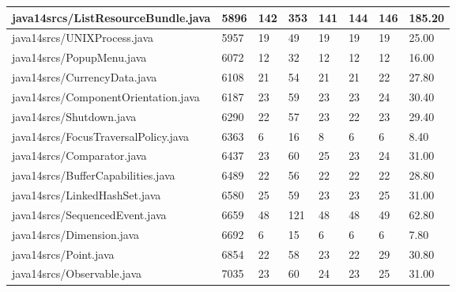 \begin{tabular}{|l|l|l|l|l|l|l|l|}
\hline
java14srcs/ListResourceBundle.java                 & 5896        & 142       & 353       & 141       & 144       & 146       & 185.20    \\
\hline
java14srcs/UNIXProcess.java                        & 5957        & 19        & 49        & 19        & 19        & 19        & 25.00     \\
\hline
java14srcs/PopupMenu.java                          & 6072        & 12        & 32        & 12        & 12        & 12        & 16.00     \\
\hline
java14srcs/CurrencyData.java                       & 6108        & 21        & 54        & 21        & 21        & 22        & 27.80     \\
\hline
java14srcs/ComponentOrientation.java               & 6187        & 23        & 59        & 23        & 23        & 24        & 30.40     \\
\hline
java14srcs/Shutdown.java                           & 6290        & 22        & 57        & 23        & 22        & 23        & 29.40     \\
\hline
java14srcs/FocusTraversalPolicy.java               & 6363        & 6         & 16        & 8         & 6         & 6         & 8.40      \\
\hline
java14srcs/Comparator.java                         & 6437        & 23        & 60        & 25        & 23        & 24        & 31.00     \\
\hline
java14srcs/BufferCapabilities.java                 & 6489        & 22        & 56        & 22        & 22        & 22        & 28.80     \\
\hline
java14srcs/LinkedHashSet.java                      & 6580        & 25        & 59        & 23        & 23        & 25        & 31.00     \\
\hline
java14srcs/SequencedEvent.java                     & 6659        & 48        & 121       & 48        & 48        & 49        & 62.80     \\
\hline
java14srcs/Dimension.java                          & 6692        & 6         & 15        & 6         & 6         & 6         & 7.80      \\
\hline
java14srcs/Point.java                              & 6854        & 22        & 58        & 23        & 22        & 29        & 30.80     \\
\hline
java14srcs/Observable.java                         & 7035        & 23        & 60        & 24        & 23        & 25        & 31.00     \\

\end{tabular}
